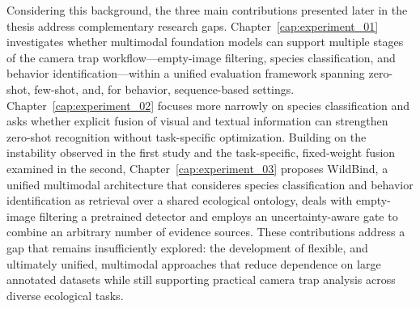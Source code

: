 Considering this background, the three main contributions presented later in the thesis address complementary research gaps. Chapter~\ref{cap:experiment_01} investigates whether multimodal foundation models can support multiple stages of the camera trap workflow—empty-image filtering, species classification, and behavior identification—within a unified evaluation framework spanning zero-shot, few-shot, and, for behavior, sequence-based settings. Chapter~\ref{cap:experiment_02} focuses more narrowly on species classification and asks whether explicit fusion of visual and textual information can strengthen zero-shot recognition without task-specific optimization. Building on the instability observed in the first study and the task-specific, fixed-weight fusion examined in the second, Chapter~\ref{cap:experiment_03} proposes WildBind, a unified multimodal architecture that consideres species classification and behavior identification as retrieval over a shared ecological ontology, deals with empty-image filtering a pretrained detector and employs an uncertainty-aware gate to combine an arbitrary number of evidence sources. These contributions address a gap that remains insufficiently explored: the development of flexible, and ultimately unified, multimodal approaches that reduce dependence on large annotated datasets while still supporting practical camera trap analysis across diverse ecological tasks.
